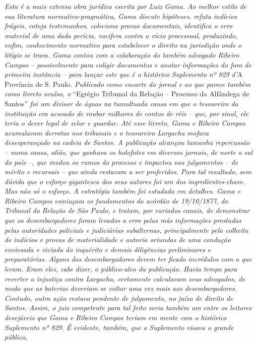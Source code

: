 \emph{Esta é a mais extensa obra jurídica escrita por Luiz Gama. Ao
melhor estilo de sua literatura normativo-pragmática, Gama discute
hipóteses, refuta indícios frágeis, coteja testemunhos, coleciona provas
documentais, identifica o erro material de uma dada perícia, vocifera
contra o vício processual, produzindo, enfim, conhecimento normativo
para estabelecer o direito na jurisdição onde o litígio se trava. Gama
contou com a colaboração do também advogado Ribeiro Campos --
possivelmente para coligir documentos e anotar informações do foro de
primeira instância -- para lançar este que é o histórico Suplemento nº
829 d'}A Província de S. Paulo\emph{. Publicado como encarte do jornal e
ao que parece também como livreto avulso, o} ``Egrégio Tribunal da
Relação -- Processo da Alfândega de Santos'' \emph{foi um divisor de
águas na tumultuada causa em que o tesoureiro da instituição era acusado
de roubar milhares de contos de réis -- que, por sinal, ele teria o
dever legal de zelar e guardar. Até esse livreto, Gama e Ribeiro Campos
acumulavam derrotas nos tribunais e o tesoureiro Largacha mofava
desesperançado na cadeia de Santos. A publicação alcançou tamanha
repercussão -- numa causa, aliás, que ganhava os holofotes em diversos
jornais, de norte a sul do país --, que mudou os rumos do processo e
impactou nos julgamentos -- de mérito e recursais -- que ainda restavam
a ser proferidos. Para tal resultado, sem dúvida que o esforço
gigantesco dos seus autores foi um dos ingredientes-chave. Mas não só o
esforço. A estratégia também foi estudada em detalhes. Gama e Ribeiro
Campos esmiuçam os fundamentos do acórdão de 19/10/1877, do Tribunal da
Relação de São Paulo, e tratam, por variados canais, de demonstrar que
os desembargadores foram levados a erro pelas más informações prestadas
pelas autoridades policiais e judiciárias subalternas, principalmente
pela colheita de indícios e provas de materialidade e autoria oriundas
de uma condução enviesada e viciada do inquérito e demais diligências
preliminares e preparatórias. Alguns dos desembargadores devem ter
ficado incrédulos com o que leram. Eram eles, cabe dizer, o público-alvo
da publicação. Havia tempo para reverter a injustiça contra Largacha,
certamente calculavam seus advogados, de modo que as baterias deveriam
se voltar uma vez mais aos desembargadores. Contudo, outra ação restava
pendente de julgamento, no juízo de direito de Santos. Assim, o juiz
competente para tal feito seria também um entre os leitores desejáveis
que Gama e Ribeiro Campos teriam em mente com o histórico Suplemento nº
829. É evidente, também, que o Suplemento visava o grande público,
}

